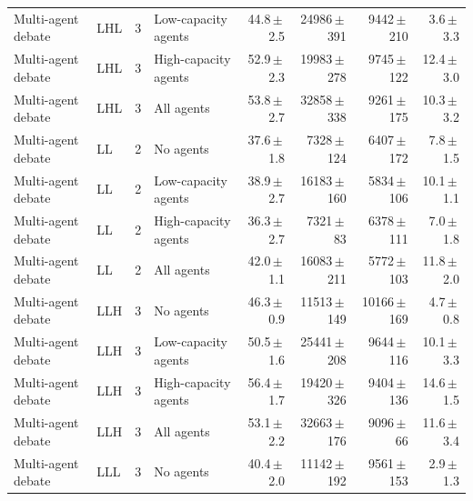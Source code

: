 \begin{table}[htbp]
\begin{tabular}{llclrrrr}
Multi-agent debate & LHL & 3 & Low-capacity agents & 44.8{\scriptsize\,$\pm$\,2.5} & 24986{\scriptsize\,$\pm$\,391} & 9442{\scriptsize\,$\pm$\,210} & 3.6{\scriptsize\,$\pm$\,3.3} \\
Multi-agent debate & LHL & 3 & High-capacity agents & 52.9{\scriptsize\,$\pm$\,2.3} & 19983{\scriptsize\,$\pm$\,278} & 9745{\scriptsize\,$\pm$\,122} & 12.4{\scriptsize\,$\pm$\,3.0} \\
Multi-agent debate & LHL & 3 & All agents & 53.8{\scriptsize\,$\pm$\,2.7} & 32858{\scriptsize\,$\pm$\,338} & 9261{\scriptsize\,$\pm$\,175} & 10.3{\scriptsize\,$\pm$\,3.2} \\
Multi-agent debate & LL & 2 & No agents & 37.6{\scriptsize\,$\pm$\,1.8} & 7328{\scriptsize\,$\pm$\,124} & 6407{\scriptsize\,$\pm$\,172} & 7.8{\scriptsize\,$\pm$\,1.5} \\
Multi-agent debate & LL & 2 & Low-capacity agents & 38.9{\scriptsize\,$\pm$\,2.7} & 16183{\scriptsize\,$\pm$\,160} & 5834{\scriptsize\,$\pm$\,106} & 10.1{\scriptsize\,$\pm$\,1.1} \\
Multi-agent debate & LL & 2 & High-capacity agents & 36.3{\scriptsize\,$\pm$\,2.7} & 7321{\scriptsize\,$\pm$\,83} & 6378{\scriptsize\,$\pm$\,111} & 7.0{\scriptsize\,$\pm$\,1.8} \\
Multi-agent debate & LL & 2 & All agents & 42.0{\scriptsize\,$\pm$\,1.1} & 16083{\scriptsize\,$\pm$\,211} & 5772{\scriptsize\,$\pm$\,103} & 11.8{\scriptsize\,$\pm$\,2.0} \\
Multi-agent debate & LLH & 3 & No agents & 46.3{\scriptsize\,$\pm$\,0.9} & 11513{\scriptsize\,$\pm$\,149} & 10166{\scriptsize\,$\pm$\,169} & 4.7{\scriptsize\,$\pm$\,0.8} \\
Multi-agent debate & LLH & 3 & Low-capacity agents & 50.5{\scriptsize\,$\pm$\,1.6} & 25441{\scriptsize\,$\pm$\,208} & 9644{\scriptsize\,$\pm$\,116} & 10.1{\scriptsize\,$\pm$\,3.3} \\
Multi-agent debate & LLH & 3 & High-capacity agents & 56.4{\scriptsize\,$\pm$\,1.7} & 19420{\scriptsize\,$\pm$\,326} & 9404{\scriptsize\,$\pm$\,136} & 14.6{\scriptsize\,$\pm$\,1.5} \\
Multi-agent debate & LLH & 3 & All agents & 53.1{\scriptsize\,$\pm$\,2.2} & 32663{\scriptsize\,$\pm$\,176} & 9096{\scriptsize\,$\pm$\,66} & 11.6{\scriptsize\,$\pm$\,3.4} \\
Multi-agent debate & LLL & 3 & No agents & 40.4{\scriptsize\,$\pm$\,2.0} & 11142{\scriptsize\,$\pm$\,192} & 9561{\scriptsize\,$\pm$\,153} & 2.9{\scriptsize\,$\pm$\,1.3} \\

\end{tabular}
\end{table}
